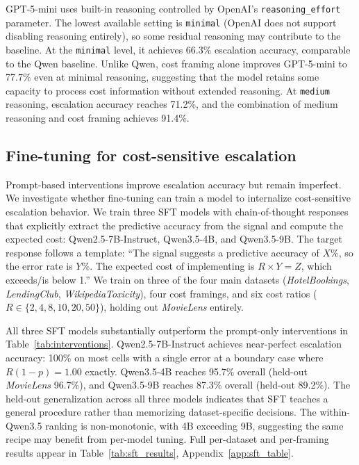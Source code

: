 \documentclass{article}
\begin{document}
GPT-5-mini uses built-in reasoning controlled by OpenAI's \texttt{reasoning\_effort} parameter. The lowest available setting is \texttt{minimal} (OpenAI does not support disabling reasoning entirely), so some residual reasoning may contribute to the baseline. At the \texttt{minimal} level, it achieves 66.3\% escalation accuracy, comparable to the Qwen baseline. Unlike Qwen, cost framing alone improves GPT-5-mini to 77.7\% even at minimal reasoning, suggesting that the model retains some capacity to process cost information without extended reasoning. At \texttt{medium} reasoning, escalation accuracy reaches 71.2\%, and the combination of medium reasoning and cost framing achieves 91.4\%.

\subsection{Fine-tuning for cost-sensitive escalation}

Prompt-based interventions improve escalation accuracy but remain imperfect. We investigate whether fine-tuning can train a model to internalize cost-sensitive escalation behavior. We train three SFT models with chain-of-thought responses that explicitly extract the predictive accuracy from the signal and compute the expected cost: Qwen2.5-7B-Instruct, Qwen3.5-4B, and Qwen3.5-9B. The target response follows a template: ``The signal suggests a predictive accuracy of $X$\%, so the error rate is $Y$\%. The expected cost of implementing is $R \times Y = Z$, which exceeds/is below 1.'' We train on three of the four main datasets (\emph{HotelBookings}, \emph{LendingClub}, \emph{WikipediaToxicity}), four cost framings, and six cost ratios ($R \in \{2, 4, 8, 10, 20, 50\}$), holding out \emph{MovieLens} entirely.

All three SFT models substantially outperform the prompt-only interventions in Table~\ref{tab:interventions}. Qwen2.5-7B-Instruct achieves near-perfect escalation accuracy: 100\% on most cells with a single error at a boundary case where $R(1-p) = 1.00$ exactly. Qwen3.5-4B reaches 95.7\% overall (held-out \emph{MovieLens} 96.7\%), and Qwen3.5-9B reaches 87.3\% overall (held-out 89.2\%). The held-out generalization across all three models indicates that SFT teaches a general procedure rather than memorizing dataset-specific decisions. The within-Qwen3.5 ranking is non-monotonic, with 4B exceeding 9B, suggesting the same recipe may benefit from per-model tuning. Full per-dataset and per-framing results appear in Table~\ref{tab:sft_results}, Appendix~\ref{app:sft_table}.
\end{document}
